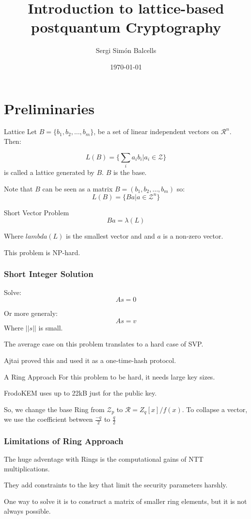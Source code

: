 \documentclass[presentation]{beamer}
\author{Sergi Simón Balcells}
\date{\today}
\title{Introduction to lattice-based postquantum Cryptography}
\begin{document}
\maketitle

\section{Preliminaries}


\begin{frame}[label=lattice]{Lattice}
  Let \(B = \{b_1, b_2, \dots, b_m\}\), be a set of linear
  independent
  vectors on \(\mathcal R ^ n\). Then:

  \[
    L(B) = \{\sum_i a_i b_i | a_i \in \mathcal Z \}
  \]
  is called a lattice generated by \(B\). \(B\) is the base.

  Note that \(B\) can be seen as a matrix \(B = (b_1, b_2,
  \dots, b_m)\)
  so:
  \[
    L(B) = \{Ba | a \in \mathcal Z^{n} \}
  \]
\end{frame}
\begin{frame}[label=short-vector-problem]{Short Vector Problem}
  \[
    Ba = \lambda(L)
  \]

  Where \(lambda (L)\) is the smallest vector and and \(a\)
  is a non-zero
  vector.

  This problem is NP-hard.
\end{frame}
\begin{frame}[label=short-integer-solution]
  \frametitle{Short Integer Solution}
  Solve:
  \[
    As = 0
  \]

  Or more generaly:
  \[
    As = v
  \]
  Where \(||s||\) is small.

  The average case on this problem translates to a hard case
  of SVP.

  Ajtai proved this and used it as a one-time-hash protocol.
\end{frame}
\begin{frame}[label=a-ring-approach]{A Ring Approach}
  For this problem to be hard, it needs large key sizes.

  FrodoKEM uses up to 22kB just for the public key.

  So, we change the base Ring from \(\mathcal Z_p\) to
  \(\mathcal R = Z_q[x] / f(x)\).
  \pause
  To collapse a vector, we use the coefficient between 
  $\frac{-q}{2}$ to $\frac{q}{2}$
\end{frame}
\begin{frame}[label=limitations-of-ring-approach]
  \frametitle{Limitations of Ring Approach}
  The huge adventage with Rings is the computational gains of NTT
  multiplications.

  They add constraints to the key that limit the security
  parameters
  harshly.

  One way to solve it is to construct a matrix of smaller ring
  elements,
  but it is not always possible.
\end{frame}
\end{document}
